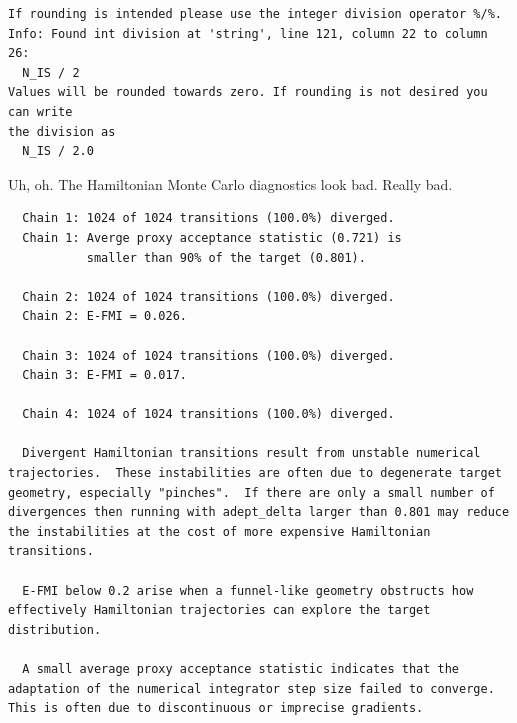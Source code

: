 \documentclass[
  letterpaper,
  DIV=11,
  numbers=noendperiod]{scrartcl}
\newenvironment{Shaded}{\begin{snugshade}}{\end{snugshade}}
\newcommand{\AttributeTok}[1]{\textcolor[rgb]{0.40,0.45,0.13}{#1}}
\newcommand{\DecValTok}[1]{\textcolor[rgb]{0.68,0.00,0.00}{#1}}
\newcommand{\FunctionTok}[1]{\textcolor[rgb]{0.28,0.35,0.67}{#1}}
\newcommand{\NormalTok}[1]{\textcolor[rgb]{0.00,0.23,0.31}{#1}}
\newcommand{\OtherTok}[1]{\textcolor[rgb]{0.00,0.23,0.31}{#1}}
\newcommand{\SpecialCharTok}[1]{\textcolor[rgb]{0.37,0.37,0.37}{#1}}
\newcommand{\StringTok}[1]{\textcolor[rgb]{0.13,0.47,0.30}{#1}}
\begin{document}
\begin{Shaded}
\end{Shaded}

\begin{verbatim}
If rounding is intended please use the integer division operator %/%.
Info: Found int division at 'string', line 121, column 22 to column 26:
  N_IS / 2
Values will be rounded towards zero. If rounding is not desired you can write
the division as
  N_IS / 2.0
\end{verbatim}

Uh, oh. The Hamiltonian Monte Carlo diagnostics look bad. Really bad.

\begin{Shaded}
\end{Shaded}

\begin{verbatim}
  Chain 1: 1024 of 1024 transitions (100.0%) diverged.
  Chain 1: Averge proxy acceptance statistic (0.721) is
           smaller than 90% of the target (0.801).

  Chain 2: 1024 of 1024 transitions (100.0%) diverged.
  Chain 2: E-FMI = 0.026.

  Chain 3: 1024 of 1024 transitions (100.0%) diverged.
  Chain 3: E-FMI = 0.017.

  Chain 4: 1024 of 1024 transitions (100.0%) diverged.

  Divergent Hamiltonian transitions result from unstable numerical
trajectories.  These instabilities are often due to degenerate target
geometry, especially "pinches".  If there are only a small number of
divergences then running with adept_delta larger than 0.801 may reduce
the instabilities at the cost of more expensive Hamiltonian
transitions.

  E-FMI below 0.2 arise when a funnel-like geometry obstructs how
effectively Hamiltonian trajectories can explore the target
distribution.

  A small average proxy acceptance statistic indicates that the
adaptation of the numerical integrator step size failed to converge.
This is often due to discontinuous or imprecise gradients.
\end{verbatim}
\end{document}
